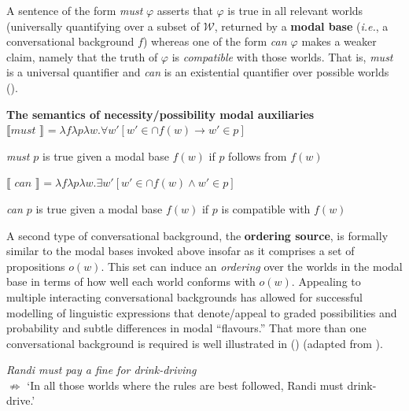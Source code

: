 \documentclass[11pt,dvipsnames]{report}
\providecommand{\denote}[2][]{\ensuremath{\llbracket{#2}\rrbracket^{#1}}}
\begin{document}
 A sentence of the form \textit{must} $ \varphi $ asserts that $ \varphi $ is true in all relevant worlds (universally quantifying over a subset of $ \mathcal W $, returned by a \textbf{modal base} (\textit{i.e.}, a conversational background $ f $) whereas one of the form \textit{can $ \varphi $} makes a weaker claim, namely that the truth of $ \varphi $ is \textit{compatible} with those worlds. That is, \textit{must} is a universal quantifier and \textit{can} is an existential quantifier over possible worlds (\nextx). %

\pex\textbf{ The semantics of necessity/possibility modal auxiliaries }
\a $ \denote{\textit{must~}}=\lambda f\lambda p\lambda w.\forall w'[w'\in\cap f(w)\to w'\in p] $

\textit{must $ p $} is true given a modal base $ f(w) $ if $ p $ follows from $ f(w) $


\a $ \denote{\textit{~can~}}=\lambda f\lambda p\lambda w.\exists w'[w'\in\cap f(w)\wedge w'\in p] $

\textit{can $ p $} is true given a modal base $ f(w) $ if $ p $ is compatible with $ f(w) $

\xe

A second type of conversational background, the \textbf{ordering source}, is formally similar to the modal bases invoked above insofar as it comprises a set of propositions $ o(w) $. This set can induce an \textit{ordering} over the worlds in the modal base in terms of how well each world conforms with $ o(w) $. Appealing to multiple interacting conversational backgrounds has allowed for successful modelling of linguistic expressions that denote/appeal to graded possibilities and probability and subtle differences in modal ``flavours.'' That more than one conversational background is required is well illustrated in (\nextx) (adapted from \citealp*{Kaufmann2006}).

\pex \textit{Randi must pay a fine for drink-driving}\\ $ \boldsymbol{\not\Rightarrow }$ `In all those worlds where the rules are best followed, Randi must drink-drive.'\label{ex:randi}\xe
\end{document}
